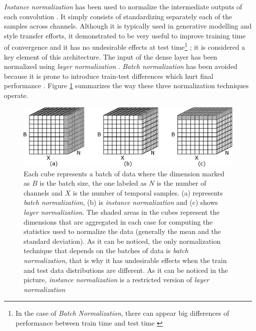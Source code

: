 \documentclass[review]{elsarticle}
\begin{document}
\textit{Instance normalization}  has been used to normalize the intermediate outputs of each convolution \cite{Ulyanov2016, Zheng2018}. It simply consists of standardizing separately each of the samples across channels. Although it is typically used in generative modelling and style transfer efforts, it demonstrated to be very useful to improve training time of convergence and it has no undesirable effects at test time\footnote{In the case of \textit{Batch Normalization}, there can appear big differences of performance between train time and test time \cite{Ba2016}} \cite{Ulyanov2016}; it is considered a key element of this architecture. The input of the dense layer has been normalized using \textit{layer normalization} \cite{Ba2016}. \textit{Batch normalization} \cite{Ioffe2015} has been avoided because it is prone to introduce train-test differences which hurt final performance \cite{Ba2016}. Figure \ref{fig:normcubes} summarizes the way these three normalization techniques operate.



\begin{figure}[h]
	\centering
	\includegraphics[width=0.7\linewidth]{img/normcubes}
	\caption{Each cube represents a batch of data where the dimension marked as $B$ is the batch size, the one labeled as $N$ is the number of channels and $X$ is the number of temporal samples. (a) represents \textit{batch normalization}, (b) is \textit{instance normalization} and (c) shows \textit{layer normalization}. The shaded areas in the cubes represent the dimensions that are aggregated in each case for computing the statistics used to normalize the data (generally the mean and the standard deviation). As it can be noticed, the only normalization technique that depends on the batches of data is \textit{batch normalization}, that is why it has undesirable effects when the train and test data distributions are different. As it can be noticed in the picture, \textit{instance normalization} is a restricted version of \textit{layer normalization}}
	\label{fig:normcubes}
\end{figure}
\end{document}
